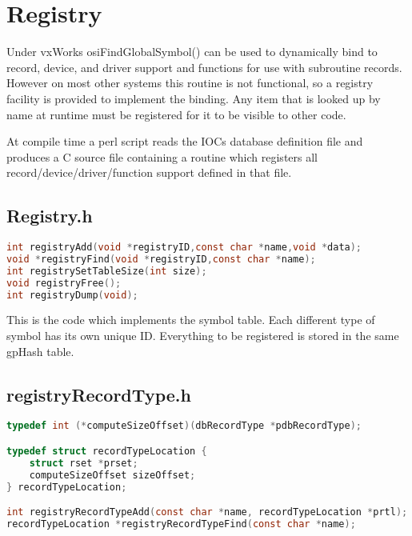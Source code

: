 \chapter{Registry}
\label{Registry}

Under vxWorks osiFindGlobalSymbol() can be used to dynamically bind to record, device, and driver support and 
functions for use with subroutine records. However on most other systems this routine is not functional, so a registry 
facility is provided to implement the binding. Any item that is looked up by name at runtime must be registered for it to be 
visible to other code.

At compile time a perl script reads the IOCs database definition file and produces a C source file containing a routine 
which registers all record/device/driver/function support defined in that file.

\section{Registry.h}

\begin{lstlisting}[language=C]
int registryAdd(void *registryID,const char *name,void *data);
void *registryFind(void *registryID,const char *name);
int registrySetTableSize(int size);
void registryFree();
int registryDump(void);
\end{lstlisting}

This is the code which implements the symbol table. Each different type of symbol has its own unique ID. Everything to 
be registered is stored in the same gpHash table.

\section{registryRecordType.h}

\begin{lstlisting}[language=C]
typedef int (*computeSizeOffset)(dbRecordType *pdbRecordType);

typedef struct recordTypeLocation {
    struct rset *prset;
    computeSizeOffset sizeOffset;
} recordTypeLocation;

int registryRecordTypeAdd(const char *name, recordTypeLocation *prtl);
recordTypeLocation *registryRecordTypeFind(const char *name);
\end{lstlisting}


